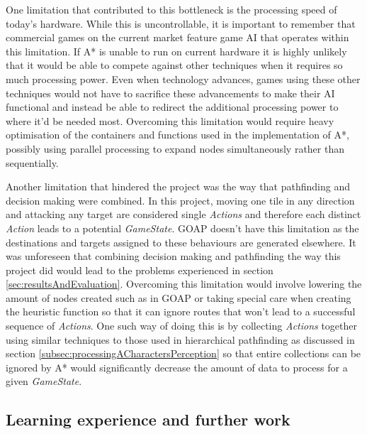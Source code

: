 \documentclass[11pt, a4paper]{report}
\begin{document}
One limitation that contributed to this bottleneck is the processing speed of today's hardware. While this is uncontrollable, it is important to remember that commercial games on the current market feature game AI that operates within this limitation. If A* is unable to run on current hardware it is highly unlikely that it would be able to compete against other techniques when it requires so much processing power. Even when technology advances, games using these other techniques would not have to sacrifice these advancements to make their AI functional and instead be able to redirect the additional processing power to where it'd be needed most. Overcoming this limitation would require heavy optimisation of the containers and functions used in the implementation of A*, possibly using parallel processing to expand nodes simultaneously rather than sequentially.

Another limitation that hindered the project was the way that pathfinding and decision making were combined. In this project, moving one tile in any direction and attacking any target are considered single \emph{Actions} and therefore each distinct \emph{Action} leads to a potential \emph{GameState}. GOAP doesn't have this limitation as the destinations and targets assigned to these behaviours are generated elsewhere. It was unforeseen that combining decision making and pathfinding the way this project did would lead to the problems experienced in section \ref{sec:resultsAndEvaluation}. Overcoming this limitation would involve lowering the amount of nodes created such as in GOAP or taking special care when creating the heuristic function so that it can ignore routes that won't lead to a successful sequence of \emph{Actions}. One such way of doing this is by collecting \emph{Actions} together using similar techniques to those used in hierarchical pathfinding as discussed in section \ref{subsec:processingACharactersPerception} so that entire collections can be ignored by A* would significantly decrease the amount of data to process for a given \emph{GameState}. 

\subsection{Learning experience and further work}
\label{subsec:learningExperienceAndFurtherWork}
\end{document}
